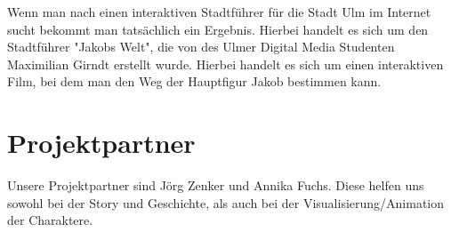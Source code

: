 \documentclass[]{hci-proposal}
\begin{document}
Wenn man nach einen interaktiven Stadtführer für die Stadt Ulm im Internet sucht bekommt man tatsächlich ein Ergebnis. Hierbei handelt
es sich um den Stadtführer "Jakobs Welt", die von des Ulmer Digital Media Studenten Maximilian Girndt erstellt wurde. Hierbei
handelt es sich um einen interaktiven Film, bei dem man den Weg der Hauptfigur Jakob bestimmen kann.


\section{Projektpartner}
Unsere Projektpartner sind Jörg Zenker und Annika Fuchs. Diese helfen uns sowohl bei der Story und Geschichte,
als auch bei der Visualisierung/Animation der Charaktere.
\end{document}
